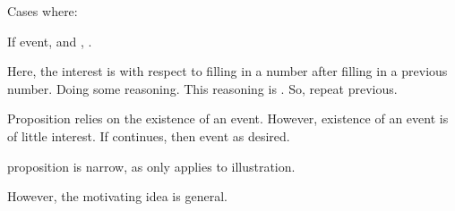 






\begin{note}
  \begin{proposition}
    Cases where:

    If event, and \tC{}, \fc{}.
  \end{proposition}

  Here, the interest is with respect to filling in a number after filling in a previous number.
  Doing some reasoning.
  This reasoning is \tR{}.
  So, repeat previous.
\end{note}

\begin{note}
  Proposition relies on the existence of an event.
  However, existence of an event is of little interest.
  If continues, then event as desired.
\end{note}

\begin{note}
  proposition is narrow, as only applies to illustration.

  However, the motivating idea is general.
\end{note}

